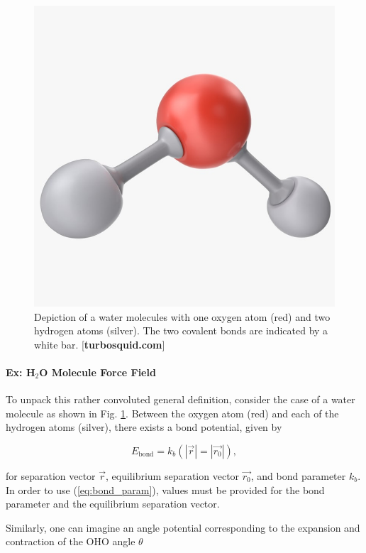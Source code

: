         \begin{figure}
            \centering
            \includegraphics[width=0.7\linewidth]{Figures/System/water-molecule.jpg}
            \caption{Depiction of a water molecules with one oxygen atom (red) and two hydrogen atoms (silver). The two covalent bonds are indicated by a white bar. [\textbf{turbosquid.com}]}
            \label{fig:water_molecule}
        \end{figure}
        
    
            \paragraph{Ex: H$_2$O Molecule Force Field}
    
            To unpack this rather convoluted general definition, consider the case of a water molecule as shown in Fig. \ref{fig:water_molecule}. Between the oxygen atom (red) and each of the hydrogen atoms (silver), there exists a bond potential, given by
            
            \begin{equation}
            \label{eq:bond_param}
                E_\text{bond} = k_b(|\vec{r}|=|\vec{r_0}|),
            \end{equation}
            
            \noindent for separation vector $\vec{r}$, equilibrium separation vector $\vec{r_0}$, and bond parameter $k_b$. In order to use (\ref{eq:bond_param}), values must be provided for the bond parameter and the equilibrium separation vector.
            
            Similarly, one can imagine an angle potential corresponding to the expansion and contraction of the OHO angle $\theta$
            
